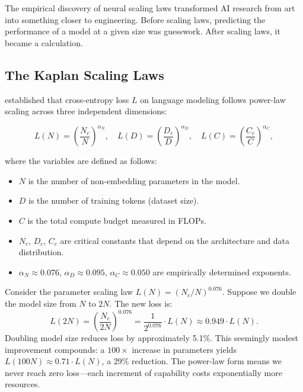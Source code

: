 The empirical discovery of neural scaling laws transformed AI research from art into something closer to engineering. Before scaling laws, predicting the performance of a model at a given size was guesswork. After scaling laws, it became a calculation.

\subsection{The Kaplan Scaling Laws}

\citet{kaplan2020} established that cross-entropy loss $L$ on language modeling follows power-law scaling across three independent dimensions:

\begin{equation}
L(N) = \left(\frac{N_c}{N}\right)^{\alpha_N}, \quad L(D) = \left(\frac{D_c}{D}\right)^{\alpha_D}, \quad L(C) = \left(\frac{C_c}{C}\right)^{\alpha_C},
\label{eq:scaling-laws}
\end{equation}

where the variables are defined as follows:
\begin{itemize}[leftmargin=1.8em]
  \item $N$ is the number of non-embedding parameters in the model.
  \item $D$ is the number of training tokens (dataset size).
  \item $C$ is the total compute budget measured in FLOPs.
  \item $N_c$, $D_c$, $C_c$ are critical constants that depend on the architecture and data distribution.
  \item $\alpha_N \approx 0.076$, $\alpha_D \approx 0.095$, $\alpha_C \approx 0.050$ are empirically determined exponents.
\end{itemize}

\begin{example}
Consider the parameter scaling law $L(N) = (N_c / N)^{0.076}$. Suppose we double the model size from $N$ to $2N$. The new loss is:
\[
L(2N) = \left(\frac{N_c}{2N}\right)^{0.076} = \frac{1}{2^{0.076}} \cdot L(N) \approx 0.949 \cdot L(N).
\]
Doubling model size reduces loss by approximately 5.1\%. This seemingly modest improvement compounds: a $100\times$ increase in parameters yields $L(100N) \approx 0.71 \cdot L(N)$, a 29\% reduction. The power-law form means we never reach zero loss---each increment of capability costs exponentially more resources.
\end{example}

